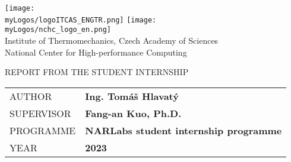 \thispagestyle{empty}




\begin{titlepage}


\texttt{[image: \\myLogos/logoITCAS\_ENGTR.png]}\hspace{4cm}
\texttt{[image: \\myLogos/nchc\_logo\_en.png]} \\[0.3cm]

\color{black!60}\Large\textsf{Institute of Thermomechanics, Czech Academy of Sciences}\\[0.3cm]
\color{black!60}\Large\textsf{National Center for High-performance Computing}
\color{black}
\vfill

{\fontsize{35}{60}}

{{\Large \textsf{REPORT FROM THE STUDENT INTERNSHIP}}\\[0.4cm]}

\vfill

\begin{tabular}{p{}|p{}}
\textsf{\small\color{chaptergrey}AUTHOR}         &   \textbf{\Large\textsf{Ing. Tomáš Hlavatý}}\\[0.1cm]
\textsf{\small\color{chaptergrey}SUPERVISOR}     &   \textbf{\Large\textsf{Fang-an Kuo, Ph.D.}}\\[0.1cm]
\textsf{\small\color{chaptergrey}PROGRAMME}    &   \textbf{\Large\textsf{NARLabs student internship programme}}\\[0.1cm]
\textsf{\small\color{chaptergrey}YEAR}           &   \textbf{\Large\textsf{2023}}
\end{tabular}

\end{titlepage}

